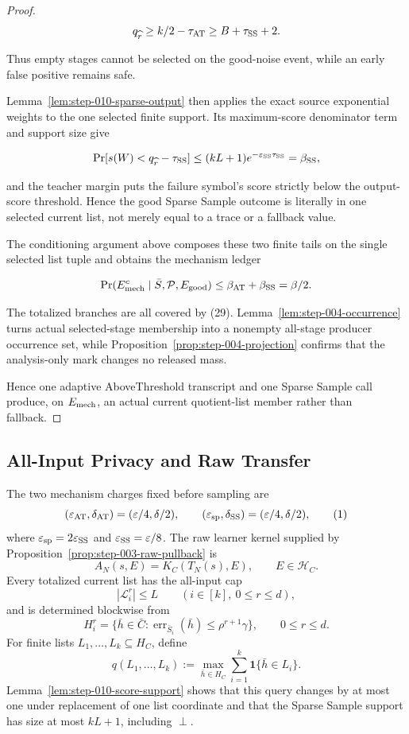 \begin{proof}
\[
 q_{\widehat r}\geq k/2-\tau_{\rm AT}
 \geq B+\tau_{\rm SS}+2.
\]

Thus empty stages cannot be selected on the good-noise event, while an
early false positive remains safe.

Lemma~\ref{lem:step-010-sparse-output} then applies the exact source
exponential weights to the one selected finite support. Its maximum-score
denominator term and support size give

\[
 \Pr[s(W)<q_{\widehat r}-\tau_{\rm SS}]
 \leq(kL+1)e^{-\varepsilon_{\rm SS}\tau_{\rm SS}}
 =\beta_{\rm SS},
\]

and the teacher margin puts the failure symbol's score strictly below the
 output-score threshold. Hence the good Sparse Sample outcome is
literally in one selected current list, not merely equal to a trace or a
fallback value.

The conditioning argument above composes these two finite tails on the
single selected list tuple and obtains the
mechanism ledger

\[
 \Pr(E_{\rm mech}^c\mid\bar S,\mathcal P,E_{\rm good})
 \leq\beta_{\rm AT}+\beta_{\rm SS}=\beta/2.
\]

The totalized branches are all covered by (29). Lemma~\ref{lem:step-004-occurrence} turns actual selected-stage membership
into a nonempty all-stage producer occurrence set, while Proposition~\ref{prop:step-004-projection} confirms that the analysis-only
mark changes no released mass.

Hence one adaptive AboveThreshold transcript and one Sparse Sample call
produce, on \(E_{\rm mech}\), an actual current quotient-list member rather
than fallback.



\end{proof}

\subsection{All-Input Privacy and Raw Transfer}\label{app:step_011}

The two mechanism charges fixed before sampling are
\[
 (\varepsilon_{\rm AT},\delta_{\rm AT})
   =(\varepsilon/4,\delta/2),
 \qquad
 (\varepsilon_{\rm sp},\delta_{\rm SS})
   =(\varepsilon/4,\delta/2),
\tag{1}
\]
where \(\varepsilon_{\rm sp}=2\varepsilon_{\rm SS}\) and
\(\varepsilon_{\rm SS}=\varepsilon/8\).  The raw learner kernel supplied
by Proposition~\ref{prop:step-003-raw-pullback} is
\[
 A_N(s,E)=K_C(T_N(s),E),
 \qquad E\in\mathcal H_C.
\tag{2}
\]
Every totalized current list has the all-input cap
\[
 |\mathcal L_i^r|\leq L
 \qquad(i\in[k],\ 0\leq r\leq d),
\tag{3}
\]
and is determined blockwise from
\[
 H_i^r
 =\{\bar h\in\bar C:
    \operatorname{err}_{\bar S_i}(\bar h)
    \leq\rho^{r+1}\gamma\},
 \qquad 0\leq r\leq d.
\tag{4}
\]
For finite lists \(L_1,\ldots,L_k\subseteq H_C\), define
\[
 q(L_1,\ldots,L_k)
 :=\max_{\bar h\in H_C}
   \sum_{i=1}^k\mathbf1\{\bar h\in L_i\}.
\tag{5}
\]
Lemma~\ref{lem:step-010-score-support} shows that this query changes by at
most one under replacement of one list coordinate and that the Sparse
Sample support has size at most \(kL+1\), including \(\perp\).

